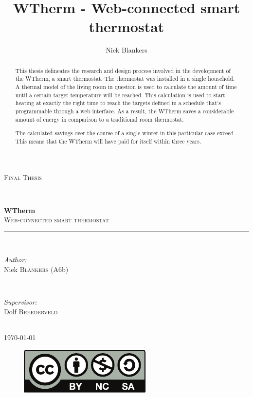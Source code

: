 \documentclass[12pt,a4paper,final]{report}
\title{WTherm - Web-connected smart thermostat}
\author{Niek Blankers}
\begin{document}
\begin{titlepage}
\newcommand{\HRule}{\rule{\linewidth}{0.5mm}}

\center

\textsc{\LARGE Final Thesis}\\[1.5cm]

\HRule \\[0.4cm]
{ \huge \bfseries WTherm}\\[0.4cm]
\textsc{\large Web-connected smart thermostat}\\[0.2cm]
\HRule \\[3.5cm]

\begin{minipage}{0.4\textwidth}
\begin{flushleft} \large
\emph{Author:}\\
Niek \textsc{Blankers} (A6b)
\end{flushleft}
\end{minipage}
~
\begin{minipage}{0.4\textwidth}
\begin{flushright} \large
\emph{Supervisor:} \\
Dolf \textsc{Breederveld}
\end{flushright}
\end{minipage}\\[8cm]

{\large \today}\\[0.3cm] 
\begin{figure}[!b]
	\centering
	\hyperref[chap:License]{\includegraphics{by-nc-sa}}
\end{figure}

\vfill

\end{titlepage}

\begin{abstract}
This thesis delineates the research and design process involved in the develop\-ment of the WTherm, a smart thermostat. The thermostat was installed in a single household. A thermal model of the living room in question is used to calculate the amount of time until a certain target temperature will be reached. This calculation is used to start heating at exactly the right time to reach the targets defined in a schedule that's programmable through a web interface. As a result, the WTherm saves a considerable amount of energy in comparison to a traditional room thermostat. 

The calculated savings over the course of a single winter in this particular case exceed . This means that the WTherm will have paid for itself within three years.
\end{abstract}
\end{document}
